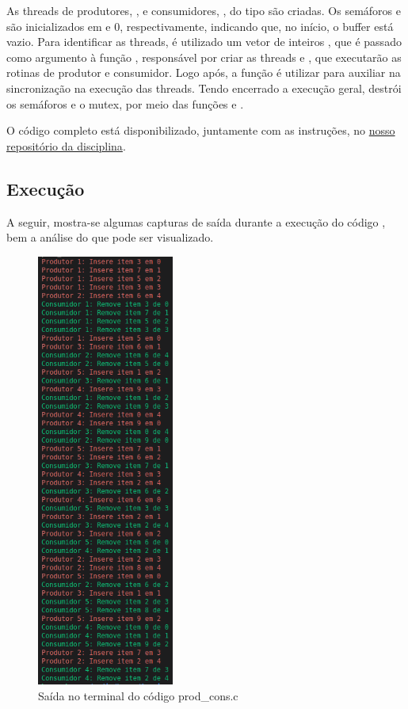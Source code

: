 \documentclass[
	12pt,				%
	openright,			%
	oneside,			%
	a4paper,			%
	chapter=TITLE,		%
	english,			%
	french,				%
	spanish,			%
	brazil				%
	]{abntex2}
\theoremstyle{definition}
\begin{document}
As threads de produtores, , e consumidores, , do tipo  são criadas. Os semáforos  e  são inicializados em  e 0, respectivamente, indicando que, no início, o buffer está vazio. Para identificar as threads, é utilizado um vetor de inteiros , que é passado como argumento à função , responsável por criar as threads  e , que executarão as rotinas de produtor e consumidor. Logo após, a função  é utilizar para auxiliar na sincronização na execução das threads. Tendo encerrado a execução geral, destrói os semáforos e o mutex, por meio das funções  e .

O código completo está disponibilizado, juntamente com as instruções, no \href{https://github.com/jvictorferreira3301/Sistemas_Operacionais}{nosso repositório da disciplina}.


\subsection{Execução}
A seguir, mostra-se algumas capturas de saída durante a execução do código , bem a análise do que pode ser visualizado.
\begin{figure}[h]
    \centering
    \includegraphics[width=0.4\textwidth]{imagens/out_prod_cons.png}
    \caption{Saída no terminal do código prod\_cons.c}
    \label{fig:out_prod_cons}
\end{figure}
\end{document}
